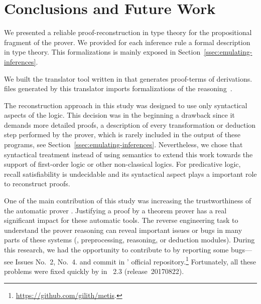 \documentclass[../main.tex]{subfiles}
\begin{document}

\section{Conclusions and Future Work}
\label{sec:conclusions}

We presented a reliable proof-reconstruction in type theory
for the propositional fragment of the \Metis prover. We provided for
each \Metis inference rule a formal description in type theory.
This formalizations is mainly exposed in
Section~\ref{ssec:emulating-inferences}.

We built the \Athena translator tool written in \Haskell
that generates \Agda proof-terms of \Metis derivations.
\Agda files generated by this translator imports
\Agda formalizations of the \Metis reasoning~\cite{AgdaProp,AgdaMetis}.

The reconstruction approach in this study was designed to use
only syntactical aspects of the logic.
This decision was in the beginning a drawback
since it demands more detailed proofs, a
description of every transformation or deduction step performed by
the prover, which is rarely included in the output of these programs,
see Section~\ref{ssec:emulating-inferences}.
Nevertheless, we chose that syntactical treatment instead of using
semantics to extend this work towards the support of first-order logic
or other non-classical logics.
For predicative logic, recall satisfiability is undecidable and
its syntactical aspect plays a important role to reconstruct proofs.

One of the main contribution of this study was increasing the
trustworthiness of the automatic prover \Metis.  Justifying a proof by
a theorem prover has a real significant impact for these automatic
tools.  The reverse engineering task to understand the prover
reasoning can reveal important issues or bugs in many parts of these
systems (\eg, preprocessing, reasoning, or deduction modules). During
this research, we had the opportunity to contribute to \Metis by
reporting some bugs---see Issues No.~2, No.~4. and commit
 in \Metis' official
repository.\footnote{\url{https://github.com/gilith/metis}.}
Fortunately, all these problems were fixed quickly by
\citeauthor{hurd2003first} in \Metis~2.3 (release~20170822).
\end{document}
